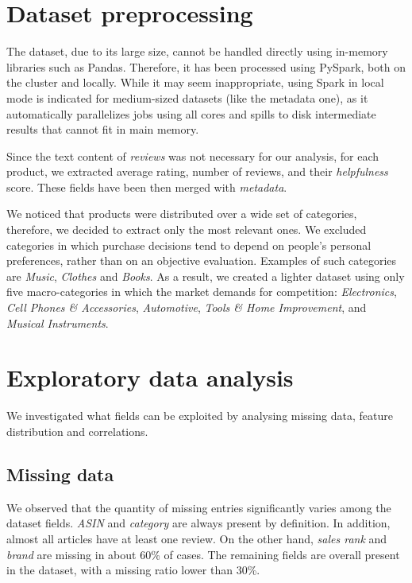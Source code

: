 \documentclass[11pt]{article}
\begin{document}
\section{Dataset preprocessing}
\label{sec:datapreprocessing}
The dataset, due to its large size, cannot be handled directly using in-memory libraries such as Pandas. Therefore, it has been processed using PySpark, both on the cluster and locally. While it may seem inappropriate, using Spark in local mode is indicated for medium-sized datasets (like the metadata one), as it automatically parallelizes jobs using all cores and spills to disk intermediate results that cannot fit in main memory.

Since the text content of \textit{reviews} was not necessary for our analysis, for each product, we extracted average rating, number of reviews, and their \textit{helpfulness} score. These fields have been then merged with \textit{metadata}.

We noticed that products were distributed over a wide set of categories, therefore, we decided to extract only the most relevant ones. We excluded categories in which purchase decisions tend to depend on people's personal preferences, rather than on an objective evaluation. Examples of such categories are \textit{Music}, \textit{Clothes} and \textit{Books}. As a result, we created a lighter dataset using only five macro-categories in which the market demands for competition: \textit{Electronics}, \textit{Cell Phones \& Accessories}, \textit{Automotive}, \textit{Tools \& Home Improvement}, and \textit{Musical Instruments}. 

\section{Exploratory data analysis}
\label{sec:explodatanalysis}
We investigated what fields can be exploited by analysing missing data, feature distribution and correlations.
\subsection{Missing data}
We observed that the quantity of missing entries significantly varies among the dataset fields. \textit{ASIN} and \textit{category} are always present by definition. In addition, almost all articles have at least one review. On the other hand, \textit{sales rank} and \textit{brand} are missing in about 60\% of cases. The remaining fields are overall present in the dataset, with a missing ratio lower than 30\%.
\end{document}

